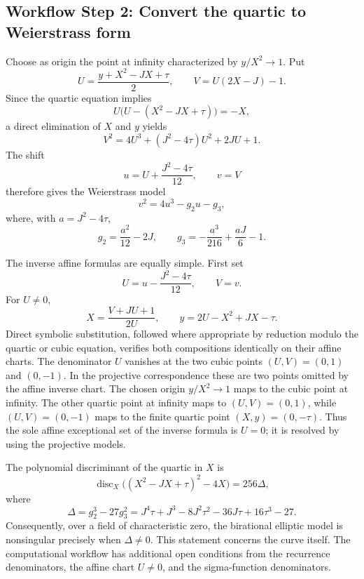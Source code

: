 \documentclass[11pt]{article}
\newcommand{\workflowstep}[1]{\subsection{Workflow Step #1}}
\newcommand{\taupar}{\tau}
\begin{document}
\workflowstep{2: Convert the quartic to Weierstrass form}
Choose as origin the point at infinity characterized by $y/X^2\to1$. Put
\begin{equation}
  U=\frac{y+X^2-JX+\taupar}{2},
  \qquad
  V=U(2X-J)-1.
  \label{eq:quartic-to-cubic}
\end{equation}
Since the quartic equation implies
\[
  U\bigl(U-(X^2-JX+\taupar)\bigr)=-X,
\]
a direct elimination of $X$ and $y$ yields
\begin{equation}
  V^2=4U^3+(J^2-4\taupar)U^2+2JU+1.
  \label{eq:cubic-with-quadratic-term}
\end{equation}
The shift
\begin{equation}
  u=U+\frac{J^2-4\taupar}{12},
  \qquad v=V
  \label{eq:cubic-shift}
\end{equation}
therefore gives the Weierstrass model
\begin{equation}
  v^2=4u^3-g_2u-g_3,
  \label{eq:weierstrass}
\end{equation}
where, with $a=J^2-4\taupar$,
\begin{equation}
  g_2=\frac{a^2}{12}-2J,
  \qquad
  g_3=-\frac{a^3}{216}+\frac{aJ}{6}-1.
  \label{eq:g2g3}
\end{equation}

The inverse affine formulas are equally simple. First set
\[
  U=u-\frac{J^2-4\taupar}{12},\qquad V=v.
\]
For $U\ne0$,
\begin{equation}
  X=\frac{V+JU+1}{2U},
  \qquad
  y=2U-X^2+JX-\taupar.
  \label{eq:cubic-to-quartic}
\end{equation}
Direct symbolic substitution, followed where appropriate by reduction modulo
the quartic or cubic equation, verifies both compositions identically on
their affine charts.
The denominator $U$ vanishes at the two cubic points $(U,V)=(0,1)$ and
$(0,-1)$. In the projective correspondence these are two points omitted by
the affine inverse chart. The chosen origin $y/X^2\to1$ maps to the cubic
point at infinity. The other quartic point at infinity maps to $(U,V)=(0,1)$,
while $(U,V)=(0,-1)$ maps to the finite quartic point
$(X,y)=(0,-\taupar)$. Thus the sole affine exceptional set of the inverse
formula is $U=0$; it is resolved by using the projective models.

The polynomial discriminant of the quartic in $X$ is
\begin{equation}
  \operatorname{disc}_X\bigl((X^2-JX+\taupar)^2-4X\bigr)
  =256\Delta,
  \label{eq:quartic-discriminant}
\end{equation}
where
\begin{equation}
  \Delta=g_2^3-27g_3^2
  =J^4\taupar+J^3-8J^2\taupar^2-36J\taupar
   +16\taupar^3-27.
  \label{eq:elliptic-discriminant}
\end{equation}
Consequently, over a field of characteristic zero, the birational elliptic
model is nonsingular precisely when $\Delta\ne0$. This statement concerns the
curve itself. The computational workflow has additional open conditions from
the recurrence denominators, the affine chart $U\ne0$, and the sigma-function
denominators.
\end{document}
